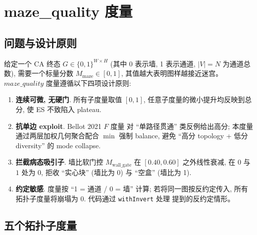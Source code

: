 
\section{maze\_quality 度量}
\label{sec:mazequality}

\subsection{问题与设计原则}

给定一个 CA 终态 $G \in \{0,1\}^{W \times H}$ (其中 0 表示墙, 1 表示通道, $|V| = N$ 为通道总数), 需要一个标量分数 $M_{\text{maze}} \in [0, 1]$, 其值越大表明图样越接近迷宫。$maze\_quality$ 度量遵循以下四项设计原则:
\begin{enumerate}[leftmargin=*, itemsep=0pt, topsep=0pt]
  \item \textbf{连续可微, 无硬门}. 所有子度量取值 $[0, 1]$, 任意子度量的微小提升均反映到总分, 使 ES 不致陷入 plateau.
  \item \textbf{抗单边 exploit}. Bellot 2021 $F$ 度量 \cite{bellot2021} 对 ``单路径贯通'' 类反例给出高分; 本度量通过两层加权几何聚合配合 $\min$ 强制 balance, 避免 ``高分 topology + 低分 diversity'' 的 mode collapse.
  \item \textbf{拦截病态吸引子}. 墙比软门控 $M_{\text{wall\_gate}}$ 在 $[0.40, 0.60]$ 之外线性衰减, 在 $0$ 与 $1$ 处为 0, 拒收 ``实心块'' (墙比为 0) 与 ``空盒'' (墙比为 1).
  \item \textbf{约定敏感}. 度量按 ``1 = 通道 / 0 = 墙'' 计算; 若将同一图按反约定传入, 所有拓扑子度量将崩塌为 0. 代码通过 \texttt{withInvert} 处理 \cite{bellot2021} 提到的反约定情形。
\end{enumerate}

\subsection{五个拓扑子度量}

